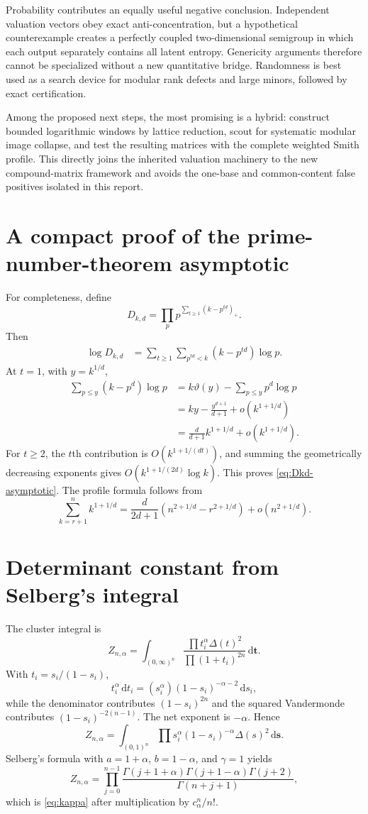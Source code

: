 \documentclass[11pt,oneside]{article}
\theoremstyle{definition}
\theoremstyle{remark}
\newcommand{\dd}{\,\mathrm{d}}
\newcommand{\vander}{\Delta}
\begin{document}
Probability contributes an equally useful negative conclusion.  Independent valuation vectors obey exact anti-concentration, but a hypothetical counterexample creates a perfectly coupled two-dimensional semigroup in which each output separately contains all latent entropy.  Genericity arguments therefore cannot be specialized without a new quantitative bridge.  Randomness is best used as a search device for modular rank defects and large minors, followed by exact certification.

Among the proposed next steps, the most promising is a hybrid: construct bounded logarithmic windows by lattice reduction, scout for systematic modular image collapse, and test the resulting matrices with the complete weighted Smith profile.  This directly joins the inherited valuation machinery to the new compound-matrix framework and avoids the one-base and common-content false positives isolated in this report.

\appendix

\section{A compact proof of the prime-number-theorem asymptotic}
\label{app:pnt}

For completeness, define
\[
 D_{k,d}=\prod_p p^{\sum_{t\ge1}(k-p^{td})_+}.
\]
Then
\begin{align*}
 \log D_{k,d}
 &=\sum_{t\ge1}\sum_{p^{td}<k}(k-p^{td})\log p.
\end{align*}
At $t=1$, with $y=k^{1/d}$,
\begin{align*}
 \sum_{p\le y}(k-p^d)\log p
 &=k\vartheta(y)-\sum_{p\le y}p^d\log p\\
 &=ky-\frac{y^{d+1}}{d+1}+o(k^{1+1/d})\\
 &=\frac{d}{d+1}k^{1+1/d}+o(k^{1+1/d}).
\end{align*}
For $t\ge2$, the $t$th contribution is $O(k^{1+1/(dt)})$, and summing the geometrically decreasing exponents gives $O(k^{1+1/(2d)}\log k)$.  This proves \eqref{eq:Dkd-asymptotic}.  The profile formula follows from
\[
 \sum_{k=r+1}^n k^{1+1/d}
 =\frac{d}{2d+1}(n^{2+1/d}-r^{2+1/d})+o(n^{2+1/d}).
\]

\section{Determinant constant from Selberg's integral}
\label{app:selberg}

The cluster integral is
\[
 Z_{n,\alpha}
 =\int_{(0,\infty)^n}
 \frac{\prod t_i^\alpha\vander(t)^2}{\prod(1+t_i)^{2n}}\dd\bm t.
\]
With $t_i=s_i/(1-s_i)$,
\[
 t_i^\alpha\dd t_i=(s_i^\alpha)(1-s_i)^{-\alpha-2}\dd s_i,
\]
while the denominator contributes $(1-s_i)^{2n}$ and the squared Vandermonde contributes $(1-s_i)^{-2(n-1)}$.  The net exponent is $-\alpha$.  Hence
\[
 Z_{n,\alpha}
 =\int_{(0,1)^n}
 \prod s_i^\alpha(1-s_i)^{-\alpha}\vander(s)^2\dd\bm s.
\]
Selberg's formula with $a=1+\alpha$, $b=1-\alpha$, and $\gamma=1$ yields
\[
 Z_{n,\alpha}
 =\prod_{j=0}^{n-1}
 \frac{\Gamma(j+1+\alpha)\Gamma(j+1-\alpha)\Gamma(j+2)}
      {\Gamma(n+j+1)},
\]
which is \eqref{eq:kappa} after multiplication by $c_\alpha^n/n!$.
\end{document}
